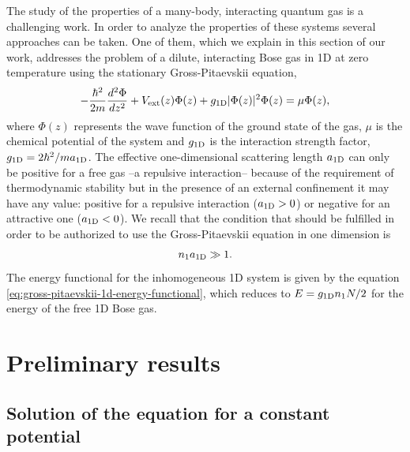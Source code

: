 The study of the properties of a many-body, interacting quantum gas is a challenging work. In order to analyze the
properties of these systems several approaches can be taken. One of them, which we explain in this section of our work,
addresses the problem of a dilute, interacting Bose gas in 1D at zero temperature using the stationary Gross-Pitaevskii
equation,
%
\begin{equation}
	-\frac{\hbar^2}{2m}\frac{d^2\Phi}{dz^2} + V_{\mathrm{ext}}(z) \Phi(z) + g_{ \mathrm{1D} } |\Phi(z)|^2 \Phi(z)
	= \mu \Phi(z),
\end{equation}
%
where $\Phi(z)$ represents the wave function of the ground state of the gas, $\mu$ is the chemical
potential of the system and $g_{ \mathrm{1D} }$ is the interaction strength factor, $g_{ \mathrm{1D} } = {2\hbar^2}/{m a_{ \mathrm{1D} }}$.
The effective one-dimensional scattering length $a_{ \mathrm{1D} }$ can only be positive for a free gas --a repulsive
interaction-- because of the requirement of thermodynamic stability %
but in the presence of an  external confinement it may have any value: positive for a repulsive interaction
($a_{ \mathrm{1D} } > 0$) or negative for an attractive one ($a_{ \mathrm{1D} } < 0$). We recall that the condition that should be
fulfilled in order to be authorized to use the Gross-Pitaevskii equation in one dimension is
%
\begin{equation}
	\label{eq:mean-field-regime-condition}
	{{n}_1} a_{ \mathrm{1D} } \gg 1.
\end{equation}
%
The energy functional for the inhomogeneous 1D system is given by the equation
\eqref{eq:gross-pitaevskii-1d-energy-functional}, which reduces to $E = g_{ \mathrm{1D} } {{n}_1} N / 2$ for the energy of
the free 1D Bose gas.


%



\section{Preliminary results}

\subsection{Solution of the {\GP} equation for a constant potential}

